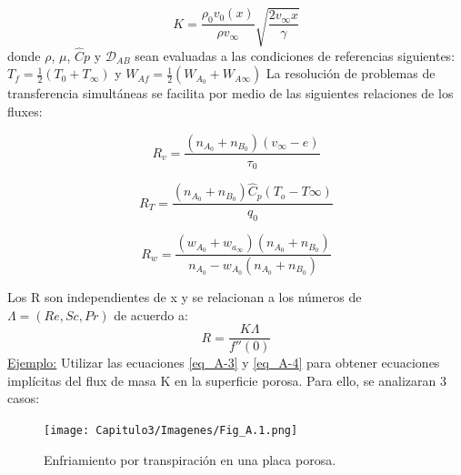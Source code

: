 \begin{equation}
    K=\frac{\rho_0 v_0 (x)}{\rho v_\infty}\sqrt{\frac{2v_\infty x}{\gamma}}
    \tag{A-2}
    \label{eq_A-2}
\end{equation}
donde $\rho$, $\mu$, $\hat{C}p$ y $\mathscr{D}_{AB}$ sean evaluadas a las condiciones de referencias siguientes: $T_f=\frac{1}{2}(T_0+T_\infty)$ y $W_{Af}=\frac{1}{2}(W_{A_0}+W_{A\infty})$
\newline
La resolución de problemas de transferencia simultáneas se facilita por medio de las siguientes relaciones de los fluxes:

\begin{equation*}
   R_v=\frac{(n_{A_0}+n_{B_0})(v_\infty-e)}{\tau_0} 
\end{equation*}

\begin{equation}
R_T=\frac{(n_{A_0}+n_{B_0})\hat{C}_p(T_o-T\infty)}{q_0} \tag{A-3} \label{eq_A-3}
\end{equation}

\begin{equation*}
R_w=\frac{(w_{A_0}+w_{a_\infty})(n_{A_0}+n_{B_0})}{n_{A_0}-w_{A_0}(n_{A_0}+n_{B_0})}
\end{equation*}

Los R son independientes de x y se relacionan a los números de $\Lambda=(Re,Sc,Pr)$ de acuerdo a:
\begin{equation*}
R=\frac{K\Lambda}{f''(0)} \tag{A-4} \label{eq_A-4}
\end{equation*}
\underline{Ejemplo:} Utilizar las ecuaciones \eqref{eq_A-3} y \eqref{eq_A-4} para obtener ecuaciones implícitas del flux de masa K en la superficie porosa. Para ello, se analizaran 3 casos:

\begin{figure}[h]

        \texttt{[image: Capitulo3/Imagenes/Fig\_A.1.png]}
    \caption{Enfriamiento por transpiración en una placa porosa.}
        \label{fig:Fig_A.1}

\end{figure}

